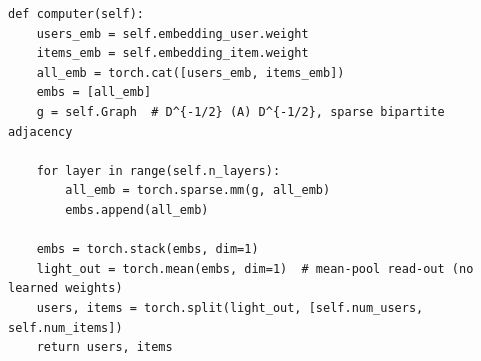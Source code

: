 
\usepackage{listings}
\usepackage{xcolor}


\begin{lstlisting}[caption={LightGCN propagation: symmetric-normalized message passing with mean read-out over layers (He et al., SIGIR'20).}, label={lst:lightgcn}]
def computer(self):
    users_emb = self.embedding_user.weight
    items_emb = self.embedding_item.weight
    all_emb = torch.cat([users_emb, items_emb])
    embs = [all_emb]
    g = self.Graph  # D^{-1/2} (A) D^{-1/2}, sparse bipartite adjacency

    for layer in range(self.n_layers):
        all_emb = torch.sparse.mm(g, all_emb)
        embs.append(all_emb)

    embs = torch.stack(embs, dim=1)
    light_out = torch.mean(embs, dim=1)  # mean-pool read-out (no learned weights)
    users, items = torch.split(light_out, [self.num_users, self.num_items])
    return users, items
\end{lstlisting}

